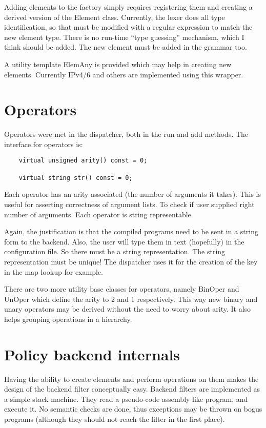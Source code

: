 \documentclass{article}
\begin{document}
Adding elements to the factory simply requires registering them and creating a
derived version of the Element class. Currently, the lexer does all type
identification, so that must be modified with a regular expression to match the
new element type. There is no run-time ``type guessing'' mechanism, which I
think should be added. The new element must be added in the grammar too.

A utility template ElemAny is provided which may help in creating new elements.
Currently IPv4/6 and others are implemented using this wrapper.

\section{Operators}
Operators were met in the dispatcher, both in the run and add methods. The
interface for operators is:
\begin{verbatim}
    virtual unsigned arity() const = 0;

    virtual string str() const = 0;
\end{verbatim}
Each operator has an arity associated (the number of arguments it takes). This
is useful for asserting correctness of argument lists. To check if user supplied
right number of arguments. Each operator is string representable.

Again, the justification is that the compiled programs need to be sent in a
string form to the backend. Also, the user will type them in text (hopefully) in
the configuration file. So there must be a string representation. The string
representation must be unique! The dispatcher uses it for the creation of the
key in the map lookup for example.

There are two more utility base classes for operators, namely BinOper and UnOper
which define the arity to 2 and 1 respectively. This way new binary and unary
operators may be derived without the need to worry about arity. It also helps
grouping operations in a hierarchy.

\section{Policy backend internals} Having the ability to create elements and
perform operations on them makes the
design of the backend filter conceptually easy. Backend filters are implemented
as a simple stack machine. They read a pseudo-code assembly like program, and
execute it. No semantic checks are done, thus exceptions may be thrown on bogus
programs (although they should not reach the filter in the first place).
\end{document}
